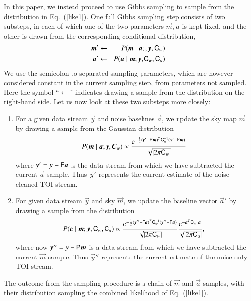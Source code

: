 \documentclass[twocolumn]{aa}
\newcommand{\ve}[1]{{\vec #1}}
\newcommand{\ma}[1]{\tens{#1}}
\newcommand{\pcal}{{P}}
\newcommand{\e}{\mathrm{e}}
\begin{document}
In this paper, we instead proceed to use Gibbs sampling to sample
from the distribution in Eq.~(\ref{like1}).  One full Gibbs sampling
step consists of two substeps, in each of which one of the two
parameters $\ve m,\ve a$ is kept fixed, and the other is drawn from
the corresponding conditional distribution,
%
\begin{eqnarray}
 \ve{m'}  &\leftarrow& \pcal(\ve m \mid \ve a;,\ve{y},\ma C_w)   \nonumber \\
 \ve{a'}  &\leftarrow& \pcal(\ve a \mid \ve m;\ve{y},\ma C_w,\ma C_a)  
\end{eqnarray}
We use the semicolon to separated sampling parameters, which are however 
considered constant in the current sampling step,
from parameters not sampled.
Here the symbol ``$\leftarrow$'' indicates drawing a sample from the
distribution on the right-hand side. 
Let us now look at these two
substeps more closely:
\begin{enumerate}
\item For a given data stream $\ve y$ and noise baselines $\ve a$,
    we update the sky map $\ve m$ by drawing a sample
    from the Gaussian distribution
%
\begin{equation}
\pcal(\ve m \mid \ve a;\ve y,\ve C_w) \propto
\frac{\e^{-\frac12(\ve y' -\ma{P}\ve{m} )^T\ma{C}_w^{-1}
                 (\ve y' -\ma{P}\ve{m} ) }}{\sqrt{|2\pi\ma{C}_w|}}  \label{slice1}
\end{equation}
%
where $\ve y'=\ve y-\ma F\ve a$ is the data stream
from which we have subtracted
the current $\ve a$ sample. 
Thus $\ve y'$ represents the current estimate of the noise-cleaned TOI stream.
\item For given data stream $\ve y$ and sky $\ve m$,
    we update the baseline vector $\ve a'$
    by drawing a sample
from the distribution
%
\begin{equation}
\pcal(\ve a \mid \ve m;\ve y,\ma C_w,\ma C_a) \propto \frac{\e^{-\frac12(\ve y'' -\ma{F}\ve{a} )^T\ma{C}_w^{-1}
                 (\ve y'' -\ma{F}\ve{a} ) }}{\sqrt{|2\pi\ma{C}_w|}}
                 \frac{\e^{-\ve{a}^T\ma{C}_a^{-1}\ve a}}{\sqrt{|2\pi\ma{C}_a|}}, \label{slice2}
\end{equation}
%
where now $\ve y''=\ve y-\ma P\ve m$
is a data stream from which we have subtracted 
the current $\ve m$ sample. Thus $\ve y''$ represents the current estimate
of the noise-only TOI stream.
\end{enumerate}
The outcome from the sampling procedure is a chain
of $\ve m$ and $\ve a$ samples,
with their distribution sampling the combined likelihood
of Eq.~(\ref{like1}).
\end{document}
